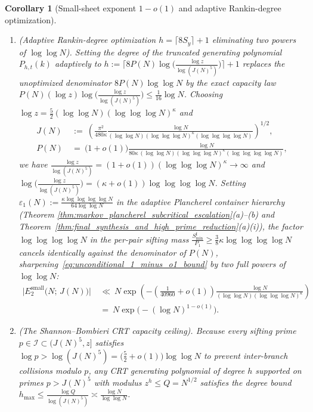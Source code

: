 \documentclass[11pt, a4paper]{article}
\theoremstyle{plain}
\newtheorem{corollary}[theorem]{Corollary}
\theoremstyle{definition}
\begin{document}
\begin{corollary}[Small-sheet exponent $1-o(1)$ and adaptive Rankin-degree optimization]
\begin{enumerate}[label=(\alph*)]
    \item \emph{(Adaptive Rankin-degree optimization $h=\lceil 8 S_y\rceil+1$ eliminating two powers of $\log\log N$).} 
    Setting the degree of the truncated generating polynomial $P_{h,t}(k)$ adaptively to $h:=\allowbreak\big\lceil 8P(N)\allowbreak\log\big(\frac{\log z}{\log(J(N)^{5})}\big)\big\rceil+\allowbreak 1$ replaces the unoptimized denominator $8P(N)\log\log N$ by the exact capacity law $P(N)\allowbreak(\log z)\allowbreak\log\big(\frac{\log z}{\log(J(N)^{5})}\big)\allowbreak\le\allowbreak\frac{1}{16}\log N$. Choosing\linebreak $\log z=\frac52(\log\log N)(\log\log\log N)^{\kappa}$ and
    \begin{equation}\label{eq:adaptive_rankin_depth_JN}
    \begin{aligned}
    J(N)\ &:=\ \left(\frac{\pi^{2}}{480\kappa}\frac{\log N}{(\log\log N)(\log\log\log N)^{\kappa}(\log\log\log\log N)}\right)^{1/2},\\[4pt]
    P(N)\ &=\ \big(1+o(1)\big)\frac{\log N}{80\kappa\,(\log\log N)(\log\log\log N)^{\kappa}(\log\log\log\log N)},
    \end{aligned}
    \end{equation}
    we have $\frac{\log z}{\log(J(N)^{5})}=(1+o(1))(\log\log\log N)^{\kappa}\to\infty$ and $\log\big(\frac{\log z}{\log(J(N)^{5})}\big)=\allowbreak(\kappa+\allowbreak o(1))\allowbreak\log\log\log\log N$. Setting $\varepsilon_1(N):=\frac{\kappa\log\log\log\log N}{64\log\log N}$ in the adaptive Plancherel container hierarchy (Theorem \ref{thm:markov_plancherel_subcritical_escalation}\allowbreak(a)--(b) and Theorem~\ref{thm:final_synthesis_and_high_prime_reduction}(a)(i)), the factor $\log\log\log\log N$ in the per-pair sifting mass $\frac{S_{\min}^{\mathrm{I}}}{P_1}\ge\frac38\kappa\log\log\log\log N$ cancels identically against the denominator of $P(N)$, sharpening~\eqref{eq:unconditional_1_minus_o1_bound} by two full powers of $\log\log N$:
    \begin{equation}\label{eq:unconditional_rankin_optimal_bound}
    \begin{aligned}
    \big|E_2^{\mathrm{small}}\big(N;\,J(N)\big)\big|\ &\ll\ N\exp\!\left(-\left(\frac{1}{40960}+o(1)\right)\frac{\log N}{(\log\log N)(\log\log\log N)^{\kappa}}\right) \\
    &=\ N\exp\!\Big(-(\log N)^{1-o(1)}\Big).
    \end{aligned}
    \end{equation}
    
    \item \emph{(The Shannon--Bombieri CRT capacity ceiling).} 
    Because every sifting prime $p\in\mathcal{I}\subset(J(N)^{5},z]$ satisfies $\log p>\log(J(N)^{5})=\big(\frac52+o(1)\big)\log\log N$ to prevent inter-branch collisions modulo $p$, any CRT generating polynomial of degree $h$ supported on primes $p>J(N)^{5}$ with modulus $z^{h}\le Q=N^{1/2}$ satisfies the degree bound $h_{\max}\le\frac{\log Q}{\log(J(N)^{5})}\asymp\frac{\log N}{\log\log N}$.
\end{enumerate}
\end{corollary}
\end{document}
